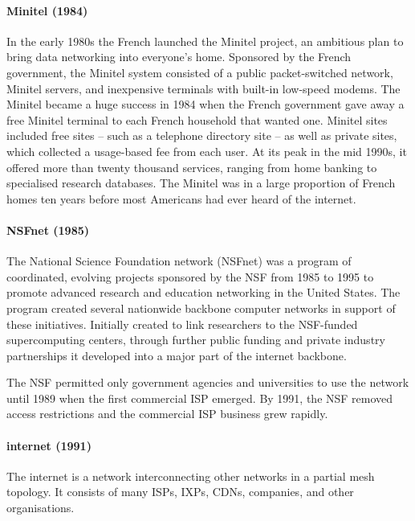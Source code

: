 {\paragraph{Minitel (1984)}
In the early 1980s the French launched the Minitel project, an ambitious plan to bring data networking into everyone’s home.
Sponsored by the French government, the Minitel system consisted of a public packet-switched network, Minitel servers, and inexpensive terminals with built-in low-speed modems.
The Minitel became a huge success in 1984 when the French government gave away a free Minitel terminal to each French household that wanted one.
Minitel sites included free sites -- such as a telephone directory site -- as well as private sites, which collected a usage-based fee from each user.
At its peak in the mid 1990s, it offered more than twenty thousand services, ranging from home banking to specialised research databases.
The Minitel was in a large proportion of French homes ten years before most Americans had ever heard of the internet.

\paragraph{NSFnet (1985)}%
The National Science Foundation network (NSFnet) was a program of coordinated, evolving projects sponsored by the \gls{NSF} from 1985 to 1995 to promote advanced research and education networking in the United States.
The program created several nationwide backbone computer networks in support of these initiatives.
Initially created to link researchers to the \gls{NSF}-funded supercomputing centers, through further public funding and private industry partnerships it developed into a major part of the internet backbone.

The \acl{NSF} permitted only government agencies and universities to use the network until 1989 when the first commercial \acl{ISP} emerged.
By 1991, the \acs{NSF} removed access restrictions and the commercial \acs{ISP} business grew rapidly.

\paragraph{internet (1991)}%
The internet is a network interconnecting other networks in a partial mesh topology.
It consists of many \aclp{ISP}, \glspl{IXP}, \glspl{CDN}, companies, and other organisations.

}
